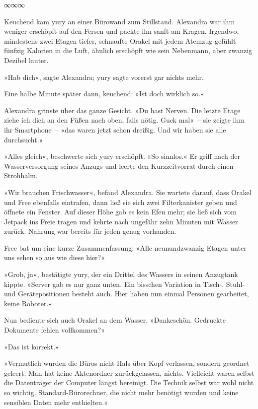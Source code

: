 \begin{center}
∞∞∞
\end{center}

Keuchend kam yury an einer Bürowand zum Stillstand. Alexandra war ihm weniger erschöpft auf den Fersen und packte ihn sanft am Kragen. Irgendwo, mindestens zwei Etagen tiefer, schnaufte Orakel mit jedem Atemzug gefühlt fünfzig Kalorien in die Luft, ähnlich erschöpft wie sein Nebenmann, aber zwanzig Dezibel lauter.

»Hab dich«, sagte Alexandra; yury sagte vorerst gar nichts mehr.

Eine halbe Minute später dann, keuchend: »Ist doch wirklich so.«

Alexandra grinste über das ganze Gesicht. »Du hast Nerven. Die letzte Etage ziehe ich dich an den Füßen nach oben, falls nötig. Guck mal«~– sie zeigte ihm ihr Smartphone~– »das waren jetzt schon dreißig. Und wir haben sie alle durchsucht.«

»Alles gleich«, beschwerte sich yury erschöpft. »So sinnlos.« Er griff nach der Wasserversorgung seines Anzugs und leerte den Kurzzeitvorrat durch einen Strohhalm.

»Wir brauchen Frischwasser«, befand Alexandra. Sie wartete darauf, dass Orakel und Free ebenfalls eintrafen, dann ließ sie sich zwei Filterkanister geben und öffnete ein Fenster. Auf dieser Höhe gab es kein Efeu mehr; sie ließ sich vom Jetpack ins Freie tragen und kehrte nach ungefähr zehn Minuten mit Wasser zurück. Nahrung war bereits für jeden genug vorhanden.

Free bat um eine kurze Zusammenfassung: »Alle neunundzwanzig Etagen unter uns sehen so aus wie diese hier?«

»Grob, ja«, bestätigte yury, der ein Drittel des Wassers in seinen Anzugtank kippte. »Server gab es nur ganz unten. Ein bisschen Variation in Tisch-, Stuhl- und Gerätepositionen besteht auch. Hier haben nun einmal Personen gearbeitet, keine Roboter.«

Nun bediente sich auch Orakel an dem Wasser. »Dankeschön. Gedruckte Dokumente fehlen vollkommen?«

»Das ist korrekt.«

»Vermutlich wurden die Büros nicht Hals über Kopf verlassen, sondern geordnet geleert. Man hat keine Aktenordner zurückgelassen, nichts. Vielleicht waren selbst die Datenträger der Computer längst bereinigt. Die Technik selbst war wohl nicht so wichtig. Standard-Bürorechner, die nicht mehr benötigt wurden und keine sensiblen Daten mehr enthielten.«

